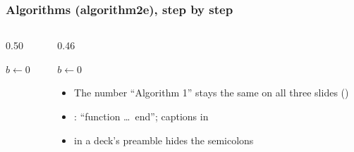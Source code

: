 \documentclass[aspectratio=169,10pt,compress]{beamer}
\begin{document}
\begin{frame}[t,fragile] \frametitle{Algorithms (algorithm2e), step by step}
	\begin{columns}[T]
		\begin{column}{0.50\textwidth}

\begin{texcode}
\begin{algorithm}[H]
  \caption{Largest($a$)}
  $b \gets 0$\;
\end{algorithm}
\end{texcode}

		\end{column}
		\begin{column}{0.46\textwidth}
			\begin{algorithm}[H]
				\caption{Largest($a$)}
				$b \gets 0$\;
				\uncover<3->{\Return{$b$}\;}
			\end{algorithm}

			\footnotesize
			\begin{itemize}
				\item The number ``Algorithm 1'' stays the same on all three slides
				()
				\item {}: ``function \dots\ end'';
				captions in 
				\item {} in a deck's preamble hides the semicolons
			\end{itemize}
		\end{column}
	\end{columns}
\end{frame}
\end{document}
